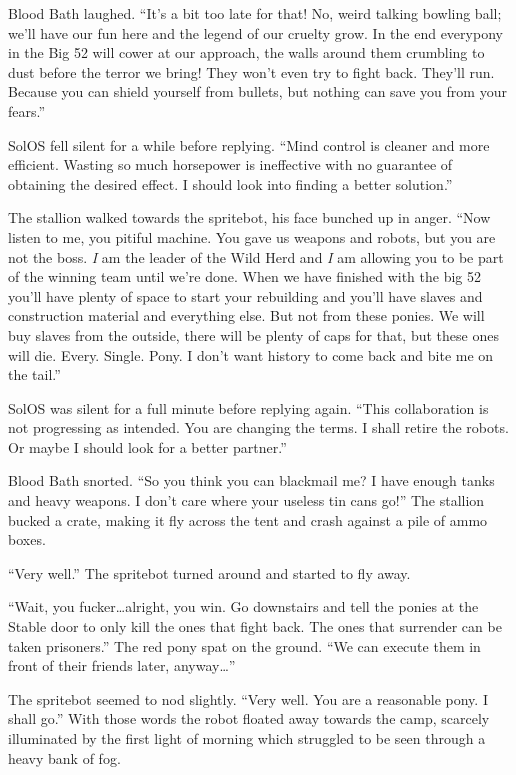 Blood Bath laughed. ``It's a bit too late for that! No, weird talking bowling ball; we'll have our fun here and the legend of our cruelty grow. In the end everypony in the Big 52 will cower at our approach, the walls around them crumbling to dust before the terror we bring! They won't even try to fight back. They'll run. Because you can shield yourself from bullets, but nothing can save you from your fears.''

SolOS fell silent for a while before replying. ``Mind control is cleaner and more efficient. Wasting so much horsepower is ineffective with no guarantee of obtaining the desired effect. I should look into finding a better solution.''

The stallion walked towards the spritebot, his face bunched up in anger. ``Now listen to me, you pitiful machine. You gave us weapons and robots, but you are not the boss. \emph{I} am the leader of the Wild Herd and \emph{I} am allowing you to be part of the winning team until we're done. When we have finished with the big 52 you'll have plenty of space to start your rebuilding and you'll have slaves and construction material and everything else. But not from these ponies. We will buy slaves from the outside, there will be plenty of caps for that, but these ones will die. Every. Single. Pony. I don't want history to come back and bite me on the tail.''

SolOS was silent for a full minute before replying again. ``This collaboration is not progressing as intended. You are changing the terms. I shall retire the robots. Or maybe I should look for a better partner.''

Blood Bath snorted. ``So you think you can blackmail me? I have enough tanks and heavy weapons. I don't care where your useless tin cans go!'' The stallion bucked a crate, making it fly across the tent and crash against a pile of ammo boxes.

``Very well.'' The spritebot turned around and started to fly away.

``Wait, you fucker\dots alright, you win. Go downstairs and tell the ponies at the Stable door to only kill the ones that fight back. The ones that surrender can be taken prisoners.'' The red pony spat on the ground. ``We can execute them in front of their friends later, anyway\dots''

The spritebot seemed to nod slightly. ``Very well. You are a reasonable pony. I shall go.'' With those words the robot floated away towards the camp, scarcely illuminated by the first light of morning which struggled to be seen through a heavy bank of fog.

